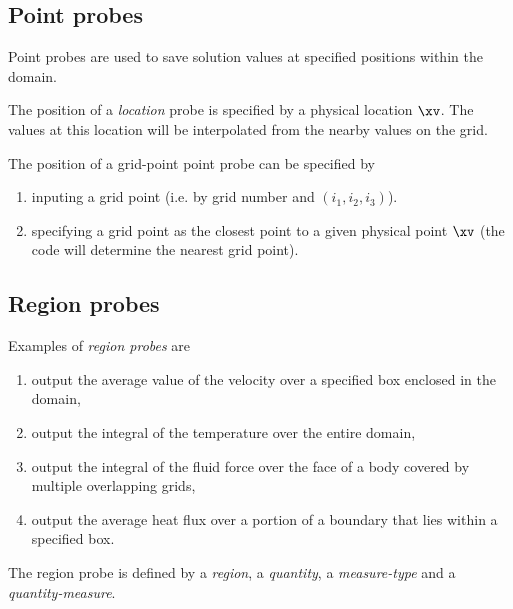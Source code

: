 \subsection{Point probes} \label{sec:pointProbes}


Point probes are used to save solution values at specified positions within the domain.

The position of a {\em location} probe is specified by a physical location $\xv$.
The values at this location will be interpolated from the nearby values on the grid.

The position of a grid-point point probe can be specified by
\begin{enumerate}
  \item inputing a grid point (i.e. by grid number and $(i_1,i_2,i_3)$).
  \item specifying a grid point as the closest point to a given physical point $\xv$ (the code will determine the nearest grid point).
\end{enumerate}


\subsection{Region probes} \label{sec:regionProbes}


Examples of {\em region probes} are
\begin{enumerate}
  \item output the average value of the velocity over a specified box enclosed in the domain, 
  \item output the integral of the temperature over the entire domain,
  \item output the integral of the fluid force over the face of a body covered by multiple overlapping grids,
  \item output the average heat flux over a portion of a boundary that lies within a specified box.
\end{enumerate}
The region probe is defined by a {\em region}, a {\em quantity}, a {\em measure-type} 
and a {\em quantity-measure}.

